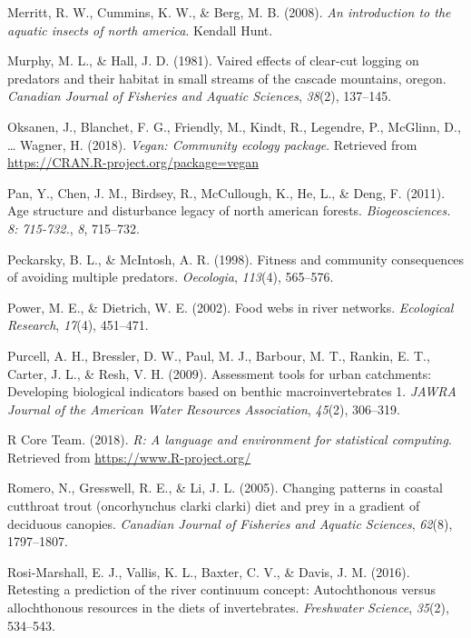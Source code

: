 \documentclass[double,12pt]{beavtex}
\begin{document}
  \hypertarget{ref-Merritt2008}{}
  Merritt, R. W., Cummins, K. W., \& Berg, M. B. (2008). \emph{An
  introduction to the aquatic insects of north america}. Kendall Hunt.
  
  \hypertarget{ref-Murphy1981}{}
  Murphy, M. L., \& Hall, J. D. (1981). Vaired effects of clear-cut
  logging on predators and their habitat in small streams of the cascade
  mountains, oregon. \emph{Canadian Journal of Fisheries and Aquatic
  Sciences}, \emph{38}(2), 137--145.
  
  \hypertarget{ref-vegan}{}
  Oksanen, J., Blanchet, F. G., Friendly, M., Kindt, R., Legendre, P.,
  McGlinn, D., \ldots{} Wagner, H. (2018). \emph{Vegan: Community ecology
  package}. Retrieved from \url{https://CRAN.R-project.org/package=vegan}
  
  \hypertarget{ref-Pan2011}{}
  Pan, Y., Chen, J. M., Birdsey, R., McCullough, K., He, L., \& Deng, F.
  (2011). Age structure and disturbance legacy of north american forests.
  \emph{Biogeosciences. 8: 715-732.}, \emph{8}, 715--732.
  
  \hypertarget{ref-Peckarsky1998}{}
  Peckarsky, B. L., \& McIntosh, A. R. (1998). Fitness and community
  consequences of avoiding multiple predators. \emph{Oecologia},
  \emph{113}(4), 565--576.
  
  \hypertarget{ref-Power2002}{}
  Power, M. E., \& Dietrich, W. E. (2002). Food webs in river networks.
  \emph{Ecological Research}, \emph{17}(4), 451--471.
  
  \hypertarget{ref-Purcell2009}{}
  Purcell, A. H., Bressler, D. W., Paul, M. J., Barbour, M. T., Rankin, E.
  T., Carter, J. L., \& Resh, V. H. (2009). Assessment tools for urban
  catchments: Developing biological indicators based on benthic
  macroinvertebrates 1. \emph{JAWRA Journal of the American Water
  Resources Association}, \emph{45}(2), 306--319.
  
  \hypertarget{ref-R-base}{}
  R Core Team. (2018). \emph{R: A language and environment for statistical
  computing}. Retrieved from \url{https://www.R-project.org/}
  
  \hypertarget{ref-Romero2005}{}
  Romero, N., Gresswell, R. E., \& Li, J. L. (2005). Changing patterns in
  coastal cutthroat trout (oncorhynchus clarki clarki) diet and prey in a
  gradient of deciduous canopies. \emph{Canadian Journal of Fisheries and
  Aquatic Sciences}, \emph{62}(8), 1797--1807.
  
  \hypertarget{ref-Rosi2016}{}
  Rosi-Marshall, E. J., Vallis, K. L., Baxter, C. V., \& Davis, J. M.
  (2016). Retesting a prediction of the river continuum concept:
  Autochthonous versus allochthonous resources in the diets of
  invertebrates. \emph{Freshwater Science}, \emph{35}(2), 534--543.
  
\end{document}
